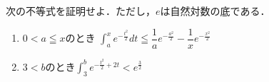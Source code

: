 \documentclass[../../main.tex]{subfiles}
\begin{document}
次の不等式を証明せよ．ただし，$e$は自然対数の底である．
\begin{enumerate}
  \item $0<a \leqq x$のとき
    $\displaystyle\int_a^xe^{-\frac{t^2}{2}}dt\leqq\dfrac{1}{a}e^{-\frac{a^2}{2}}-\dfrac{1}{x}e^{-\frac{x^2}{2}}$
  \item $3<b$のとき$\displaystyle\int_3^be^{-\frac{t^2}{2}+2t}<e^{\frac{3}{2}}$
\end{enumerate}
\end{document}
